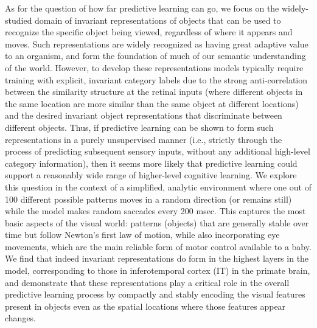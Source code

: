\documentclass[11pt,twoside]{article}
\newif\myifpdf
\begin{document}
As for the question of how far predictive learning can go, we focus on the widely-studied domain of invariant representations of objects that can be used to recognize the specific object being viewed, regardless of where it appears and moves.  Such representations are widely recognized as having great adaptive value to an organism, and form the foundation of much of our semantic understanding of the world.  However, to develop these representations models typically require training with explicit, invariant category labels due to the strong anti-correlation between the similarity structure at the retinal inputs (where different objects in the same location are more similar than the same object at different locations) and the desired invariant object representations that discriminate between different objects.  Thus, if predictive learning can be shown to form such representations in a purely unsupervised manner (i.e., strictly through the process of predicting subsequent sensory inputs, without any additional high-level category information), then it seems more likely that predictive learning could support a reasonably wide range of higher-level cognitive learning.  We explore this question in the context of a simplified, analytic environment where one out of 100 different possible patterns  moves in a random direction (or remains still) while the model makes random saccades every 200 msec. This captures the most basic aspects of the visual world: patterns (objects) that are generally stable over time but follow Newton's first law of motion, while also incorporating eye movements, which are the main reliable form of motor control available to a baby.   We find that indeed invariant representations do form in the highest layers in the model, corresponding to those in inferotemporal cortex (IT) in the primate brain, and demonstrate that these representations play a critical role in the overall predictive learning process by compactly and stably encoding the visual features present in objects even as the spatial locations where those features appear changes.

\end{document}
